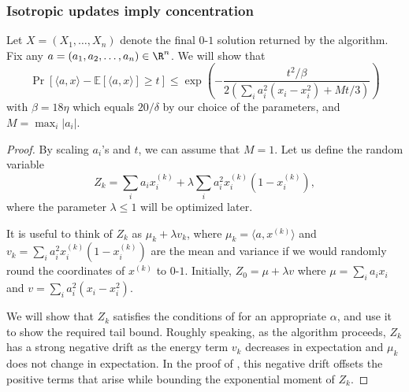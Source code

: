 \documentclass{toc}
\newcommand{\ip}[1]{\langle #1 \rangle}
\newcommand{\E}{\mathbb{E}}
\begin{document}
\subsubsection{Isotropic updates imply concentration}
Let $X=(X_1,\ldots,X_n)$ denote the final $0$-$1$ solution returned by the algorithm. Fix any $a=(a_1,a_2,\ldots,a_n) \in \R^n$. We will show that
\[ \Pr[\ip{a,x} - \E[\ip{a,x}]  \geq t] \leq \exp \left( - \frac{t^2/\beta}{2 (\sum_i a_i^2(x_i-x_i^2) + Mt/3)} \right)  \]
with $\beta = 18 \eta$ which equals $20/\delta$ by our choice of the parameters, and $M=\max_i |a_i|$.
\begin{proof} By scaling $a_i$'s and $t$, we can assume that $M=1$.
Let us define the random variable
\[ Z_k = \sum_i a_i x_i^{(k)} + \lambda \sum_i  a_i^2 x_i^{(k)}(1-x_i^{(k)}),\]
where the parameter $\lambda \leq 1$ will be optimized later.

It is useful to think of $Z_k$ as $\mu_k + \lambda v_k$, where $\mu_k = \langle a,x^{(k)} \rangle $ and $v_k =\sum_i  a_i^2 x_i^{(k)}(1-x_i^{(k)})$ are the mean and variance if we would randomly round the coordinates of $x^{(k)}$ to $0$-$1$. Initially, 
$Z_0 = \mu + \lambda v$ where $\mu = \sum_i a_i x_i$ and $v =  \sum_i a_i^2 ( x_i-x_i^2)$. 

We will show that $Z_k$ satisfies the conditions of  for an appropriate $\alpha$, and use it to show the required tail bound. Roughly speaking, as the algorithm proceeds, $Z_k$ has a strong negative drift as the energy term $v_k$ decreases in expectation and $\mu_k$ does not change in expectation. In the proof of , this negative drift offsets the positive terms that arise while bounding the exponential moment of $Z_k$.



\end{proof}
\end{document}

